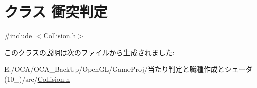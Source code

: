 \hypertarget{class_xE8_xA1_x9D_xE7_xAA_x81_xE5_x88_xA4_xE5_xAE_x9A}{\section{クラス 衝突判定}
\label{class_xE8_xA1_x9D_xE7_xAA_x81_xE5_x88_xA4_xE5_xAE_x9A}
}


{\ttfamily \#include $<$Collision.\-h$>$}



このクラスの説明は次のファイルから生成されました\-:\begin{DoxyCompactItemize}
\item 
E\-:/\-O\-C\-A/\-O\-C\-A\-\_\-\-Back\-Up/\-Open\-G\-L/\-Game\-Proj/当たり判定と職種作成とシェーダ(10\-\_)/src/\hyperlink{_collision_8h}{Collision.\-h}\end{DoxyCompactItemize}
